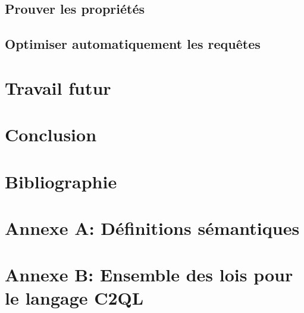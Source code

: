 \documentclass[a4paper,11pt]{article}
\begin{document}
\subsection{Prouver les propriétés}
\label{proof}


\subsection{Optimiser automatiquement les requêtes}
\label{opti}


\section{Travail futur}
\label{discusion}


\section{Conclusion}



\newpage
\renewcommand{\thepage}{\Roman{page}}
\setcounter{page}{1}
\appendix

\section*{Bibliographie}
\begin{otherlanguage}{english}
	\printbibliography
\end{otherlanguage}

\newpage
\section*{Annexe A: Définitions sémantiques}


\newpage
\section*{Annexe B: Ensemble des lois pour le langage C2QL}
\newcommand{\args}{Soit $\delta_1$ le schéma relationnel du premier
	argument et $\delta_2$ le schéma relationnel du deuxième
	argument.}


%
\end{document}

